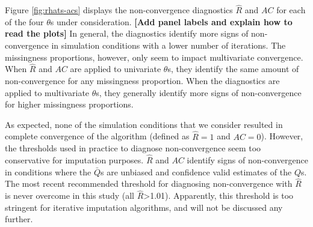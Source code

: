 \documentclass[Royal,times,sageh]{sagej}
\begin{document}
Figure \ref{fig:rhats-acs} displays the non-convergence diagnostics \(\widehat{R}\) and \(AC\) for each of the four \(\theta\)s under consideration. \textbf{{[}Add panel labels and explain how to read the plots{]}} In general, the diagnostics identify more signs of non-convergence in simulation conditions with a lower number of iterations. The missingness proportions, however, only seem to impact multivariate convergence. When \(\widehat{R}\) and \(AC\) are applied to univariate \(\theta\)s, they identify the same amount of non-convergence for any missingness proportion. When the diagnostics are applied to multivariate \(\theta\)s, they generally identify more signs of non-convergence for higher missingness proportions.

As expected, none of the simulation conditions that we consider resulted in complete convergence of the algorithm (defined as \(\widehat{R}=1\) and \(AC=0\)). However, the thresholds used in practice to diagnose non-convergence seem too conservative for imputation purposes. \(\widehat{R}\) and \(AC\) identify signs of non-convergence in conditions where the \(\bar{Q}\)s are unbiased and confidence valid estimates of the \(Q\)s. The most recent recommended threshold for diagnosing non-convergence with \(\widehat{R}\) is never overcome in this study (all \(\widehat{R}\)\textgreater1.01). Apparently, this threshold is too stringent for iterative imputation algorithms, and will not be discussed any further.
\end{document}
